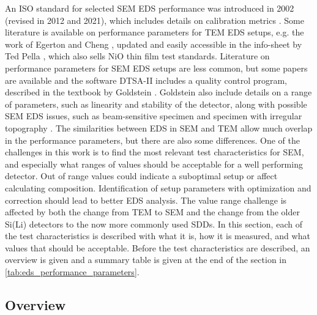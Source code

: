 An ISO standard for selected SEM EDS performance was introduced in 2002 (revised in 2012 and 2021), which includes details on calibration metrics \cite{iso_qc_15632}.
Some literature is available on performance parameters for TEM EDS setups, e.g. the work of Egerton and Cheng \cite{egerton_nio_characterization_1994}, updated and easily accessible in the info-sheet by Ted Pella \cite{ted_pella_nio_tem_2019}, which also sells NiO thin film test standards.
Literature on performance parameters for SEM EDS setups are less common, but some papers \cite{software_dtsaii,dtsaii_1_getting_started,dtsaii_2_manipulating_spectra} are available and the software DTSA-II \cite{software_dtsaii} includes a quality control program, described in the textbook by Goldstein \cite{goldstein_scanning_2018}.
Goldstein also include details on a range of parameters, such as linearity and stability of the detector, along with possible SEM EDS issues, such as beam-sensitive specimen and specimen with irregular topography \cite{goldstein_scanning_2018}.
The similarities between EDS in SEM and TEM allow much overlap in the performance parameters, but there are also some differences.
One of the challenges in this work is to find the most relevant test characteristics for SEM, and especially what ranges of values should be acceptable for a well performing detector.
Out of range values could indicate a suboptimal setup or affect calculating composition.
Identification of setup parameters with optimization and correction should lead to better EDS analysis.
The value range challenge is affected by both the change from TEM to SEM and the change from the older Si(Li) detectors to the now more commonly used SDDs.
In this section, each of the test characteristics is described with what it is, how it is measured, and what values that should be acceptable.
Before the test characteristics are described, an overview is given and a summary table is given at the end of the section in \cref{tab:eds_performance_parameters}.


\subsection{Overview}
\label{theory:eds_performance:overview}


